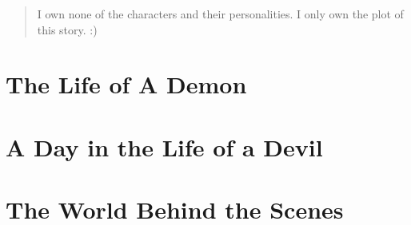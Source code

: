 \documentclass[oneside,11pt]{memoir} %
\begin{document}
\begin{quote}
I own none of the characters and their personalities. I only own the plot of this story. :)
\end{quote}





\chapter{The Life of A Demon}



\chapter{A Day in the Life of a Devil}



\chapter{The World Behind the Scenes}



\end{document}
